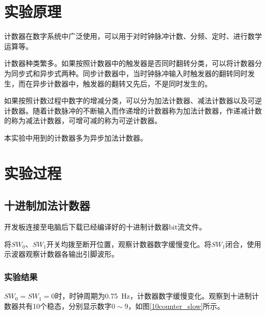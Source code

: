 \documentclass[UTF8]{ctexart}
\numberwithin{figure}{subsection}
\numberwithin{table}{subsection}
\numberwithin{equation}{subsection}
\begin{document}
\section{实验原理}
\par 计数器在数字系统中广泛使用，可以用于对时钟脉冲计数、分频、定时、进行数学运算等。
\par 计数器种类繁多。如果按照计数器中的触发器是否同时翻转分类，可以将计数器分为同步式和异步式两种。同步计数器中，当时钟脉冲输入时触发器的翻转同时发生，而在异步计数器中，触发器的翻转又先后，不是同时发生的。
\par 如果按照计数过程中数字的增减分类，可以分为加法计数器、减法计数器以及可逆计数器。随着计数脉冲的不断输入而作递增的计数器称为加法计数器，作递减计数的称为减法计数器，可增可减的称为可逆计数器。
\par 本实验中用到的计数器多为异步加法计数器。

\section{实验过程}
\subsection{十进制加法计数器}
开发板连接至电脑后下载已经编译好的十进制计数器bit流文件。
\par 将\(SW_0\)、\(SW_1\)开关均拨至断开位置，观察计数器数字缓慢变化。将\(SW_1\)闭合，使用示波器观察计数器各输出引脚波形。
\subsubsection{实验结果}
\(SW_0 = SW_1 = 0\)时，时钟周期为\SI{0.75}{\Hz}，计数器数字缓慢变化。观察到十进制计数器共有10个稳态，分别显示数字\(0\sim 9\)，如图\ref{10counter_slow}所示。
\end{document}
